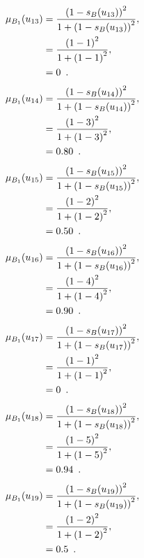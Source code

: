\documentclass[a4paper,openany]{book}
\begin{document}
				\begin{align}
					\mu_{B_1}(u_{13}) &= \frac{\left(1-s_B(u_{13})\right)^2}{1 + \left(1-s_B(u_{13})\right)^2} ,\\
					&= \frac{\left(1-1\right)^2}{1 + \left(1-1\right)^2} \notag ,\\
					&= 0 \enspace. \notag
				\end{align}
				\begin{align}
					\mu_{B_1}(u_{14}) &= \frac{\left(1-s_B(u_{14})\right)^2}{1 + \left(1-s_B(u_{14})\right)^2} ,\\
					&= \frac{\left(1-3\right)^2}{1 + \left(1-3\right)^2} \notag ,\\
					&= 0.80 \enspace. \notag
				\end{align}
				\begin{align}
					\mu_{B_1}(u_{15}) &= \frac{\left(1-s_B(u_{15})\right)^2}{1 + \left(1-s_B(u_{15})\right)^2} ,\\
					&= \frac{\left(1-2\right)^2}{1 + \left(1-2\right)^2} \notag ,\\
					&= 0.50 \enspace. \notag
				\end{align}
				\begin{align}
					\mu_{B_1}(u_{16}) &= \frac{\left(1-s_B(u_{16})\right)^2}{1 + \left(1-s_B(u_{16})\right)^2} ,\\
					&= \frac{\left(1-4\right)^2}{1 + \left(1-4\right)^2} \notag ,\\
					&= 0.90 \enspace. \notag
				\end{align}
				\begin{align}
					\mu_{B_1}(u_{17}) &= \frac{\left(1-s_B(u_{17})\right)^2}{1 + \left(1-s_B(u_{17})\right)^2} ,\\
					&= \frac{\left(1-1\right)^2}{1 + \left(1-1\right)^2} \notag ,\\
					&= 0 \enspace. \notag
				\end{align}
				\begin{align}
					\mu_{B_1}(u_{18}) &= \frac{\left(1-s_B(u_{18})\right)^2}{1 + \left(1-s_B(u_{18})\right)^2} ,\\
					&= \frac{\left(1-5\right)^2}{1 + \left(1-5\right)^2} \notag ,\\
					&= 0.94 \enspace. \notag
				\end{align}
				\begin{align}
					\mu_{B_1}(u_{19}) &= \frac{\left(1-s_B(u_{19})\right)^2}{1 + \left(1-s_B(u_{19})\right)^2} ,\\
					&= \frac{\left(1-2\right)^2}{1 + \left(1-2\right)^2} \notag ,\\
					&= 0.5 \enspace. \notag
				\end{align}
\end{document}
